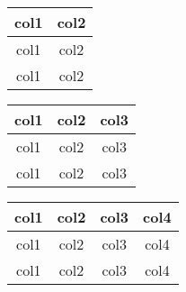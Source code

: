 \documentclass[11pt]{article}
\begin{document}
\begin{center}
\begin{tabular}{|*{2}{c|}}
\hline
col1  &      col2  \\ \hline 
col1  &  col2  \\ \hline 
col1  &  col2  \\ \hline 
\end{tabular}
\end{center}




\begin{center}
\begin{tabular}{|*{3}{c|}}
\hline
col1  &  col2  &  col3  \\ \hline 
col1  &  col2  &  col3  \\ \hline 
col1  &  col2  &  col3  \\ \hline 
\end{tabular}
\end{center}





\begin{center}
\begin{tabular}{|*{4}{c|}}
\hline
col1  &  col2  &  col3     &  col4  \\ \hline 
col1  &  col2  &  col3  &  col4  \\ \hline 
col1  &  col2  &  col3  &  col4  \\ \hline 
\end{tabular}
\end{center}
\end{document}
